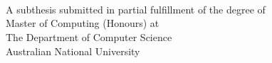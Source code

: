 
\begin{titlepage}
  \enlargethispage{2cm}
  \begin{center}
    \makeatletter
    \Huge\textbf{\@title} \\[.4cm]
    \Huge\textbf{\thesisqualifier} \\[2.5cm]
    \huge\textbf{\@author} \\[8.5cm]
    \makeatother
    \Large A subthesis submitted in partial fulfillment of the degree of \\
    \LARGE Master of Computing (Honours) at \\
    The Department of Computer Science\\
    Australian National University \\[2cm]
    \thismonth
  \end{center}
\end{titlepage}

